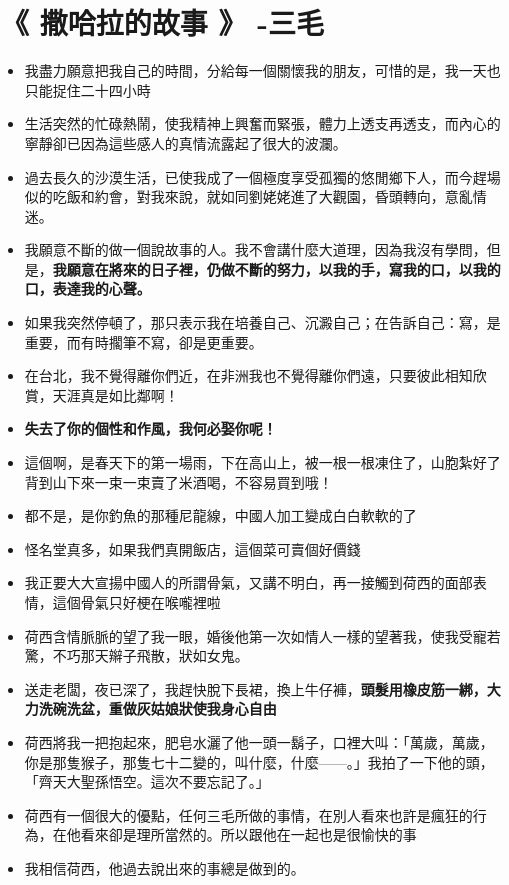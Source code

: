 \documentclass[UTF8,a4paper,8pt]{ctexart}
\begin{document}
 \section{《 撒哈拉的故事 》 -三毛  }
 \begin{itemize}
 	\item 我盡力願意把我自己的時間，分給每一個關懷我的朋友，可惜的是，我一天也只能捉住二十四小時
 	\item 生活突然的忙碌熱鬧，使我精神上興奮而緊張，體力上透支再透支，而內心的寧靜卻已因為這些感人的真情流露起了很大的波瀾。
 	\item 過去長久的沙漠生活，已使我成了一個極度享受孤獨的悠閒鄉下人，而今趕場似的吃飯和約會，對我來說，就如同劉姥姥進了大觀園，昏頭轉向，意亂情迷。
 	\item 我願意不斷的做一個說故事的人。我不會講什麼大道理，因為我沒有學問，但是，\textbf{我願意在將來的日子裡，仍做不斷的努力，以我的手，寫我的口，以我的口，表達我的心聲。}
 	\item 如果我突然停頓了，那只表示我在培養自己、沉澱自己；在告訴自己：寫，是重要，而有時擱筆不寫，卻是更重要。
 	\item 在台北，我不覺得離你們近，在非洲我也不覺得離你們遠，只要彼此相知欣賞，天涯真是如比鄰啊！
 	\item \textbf{失去了你的個性和作風，我何必娶你呢！}
 	\item 這個啊，是春天下的第一場雨，下在高山上，被一根一根凍住了，山胞紮好了背到山下來一束一束賣了米酒喝，不容易買到哦！
 	\item 都不是，是你釣魚的那種尼龍線，中國人加工變成白白軟軟的了
 	\item 怪名堂真多，如果我們真開飯店，這個菜可賣個好價錢
 	\item 我正要大大宣揚中國人的所謂骨氣，又講不明白，再一接觸到荷西的面部表情，這個骨氣只好梗在喉嚨裡啦
 	\item 荷西含情脈脈的望了我一眼，婚後他第一次如情人一樣的望著我，使我受寵若驚，不巧那天辮子飛散，狀如女鬼。
 	\item 送走老闆，夜已深了，我趕快脫下長裙，換上牛仔褲，\textbf{頭髮用橡皮筋一綁，大力洗碗洗盆，重做灰姑娘狀使我身心自由}
 	\item 荷西將我一把抱起來，肥皂水灑了他一頭一鬍子，口裡大叫：「萬歲，萬歲，你是那隻猴子，那隻七十二變的，叫什麼，什麼——。」我拍了一下他的頭，「齊天大聖孫悟空。這次不要忘記了。」
 	\item 荷西有一個很大的優點，任何三毛所做的事情，在別人看來也許是瘋狂的行為，在他看來卻是理所當然的。所以跟他在一起也是很愉快的事
 	\item 我相信荷西，他過去說出來的事總是做到的。

\end{itemize}
\end{document}
